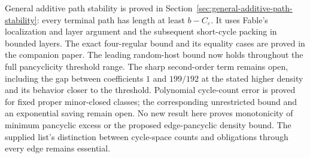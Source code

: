 General additive path stability is proved in Section~\ref{sec:general-additive-path-stability}: every terminal path has length at least $b-C_\varepsilon$.
It uses Fable's localization and layer argument and the subsequent short-cycle packing in bounded layers.
The exact four-regular bound and its equality cases are proved in the companion paper.
The leading random-host bound now holds throughout the full pancyclicity threshold range.
The sharp second-order term remains open, including the gap between coefficients $1$ and $199/192$ at the stated higher density and its behavior closer to the threshold.
Polynomial cycle-count error is proved for fixed proper minor-closed classes; the corresponding unrestricted bound and an exponential saving remain open.
No new result here proves monotonicity of minimum pancyclic excess or the proposed edge-pancyclic density bound.
The supplied list's distinction between cycle-space counts and obligations through every edge remains essential.
